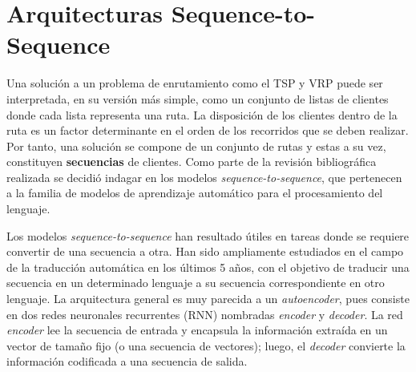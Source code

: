 


\section{Arquitecturas Sequence-to-Sequence}\label{2-Seq2seq}
Una solución a un problema de enrutamiento como el TSP y VRP puede ser interpretada, en su versión más simple, como un conjunto de listas de clientes donde cada lista representa una ruta. La disposición de los clientes dentro de la ruta es un factor determinante en el orden de los recorridos que se deben realizar. Por tanto, una solución se compone de un conjunto de rutas y estas a su vez, constituyen \textbf{secuencias} de clientes. Como parte de la revisión bibliográfica realizada se decidió indagar en los modelos \textit{sequence-to-sequence}, que pertenecen a la familia de modelos de aprendizaje automático para el procesamiento del lenguaje.

Los modelos \textit{sequence-to-sequence} \cite{SutskeverSeq2seqNN, PointerNVinyals} han resultado útiles en tareas donde se requiere convertir de una secuencia a otra. Han sido ampliamente estudiados en el campo de la traducción automática en los últimos 5 años, con el objetivo de traducir una secuencia en un determinado lenguaje a su secuencia correspondiente en otro lenguaje. La arquitectura general es muy parecida a un \textit{autoencoder}, pues consiste en dos redes neuronales recurrentes (RNN) nombradas \textit{encoder} y \textit{decoder}. La red \textit{encoder} lee la secuencia de entrada y encapsula la información extraída en un vector de tamaño fijo (o una secuencia de vectores); luego, el \textit{decoder} convierte la información codificada a una secuencia de salida. 

